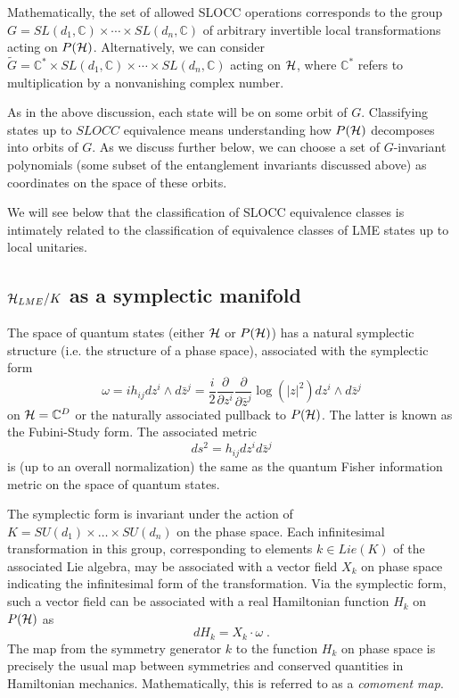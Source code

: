 \documentclass[12pt]{article}
\theoremstyle{definition}
\newcommand{\be}{\begin{equation}}
\newcommand{\ee}{\end{equation}}
\begin{document}
Mathematically, the set of allowed SLOCC operations corresponds to the group $G = SL(d_1, \mathbb{C}) \times \cdots \times SL(d_n, \mathbb{C})$ of arbitrary invertible local transformations acting on $P({\cal H})$. Alternatively, we can consider $\tilde{G} = \mathbb{C}^* \times SL(d_1, \mathbb{C}) \times \cdots \times SL(d_n, \mathbb{C})$ acting on ${\cal H}$, where $\mathbb{C}^*$ refers to multiplication by a nonvanishing complex number.

As in the above discussion, each state will be on some orbit of $G$. Classifying states up to $SLOCC$ equivalence means understanding how $P({\cal H})$ decomposes into orbits of $G$. As we discuss further below, we can choose a set of $G$-invariant polynomials (some subset of the entanglement invariants discussed above) as coordinates on the space of these orbits.

We will see below that the classification of SLOCC equivalence classes is intimately related to the classification of equivalence classes of LME states up to local unitaries.

\subsection{${\cal H}_{LME}/K$ as a symplectic manifold}

The space of quantum states (either ${\cal H}$ or $P({\cal H})$) has a natural symplectic structure (i.e. the structure of a phase space), associated with the symplectic form
\be
\omega = i h_{ij} dz^{i} \wedge  d\bar{z}^j =  \frac{i}{2} \frac{\partial}{\partial z^i} \frac{\partial}{\partial \bar{z}^j} \log (|z|^2) dz^{i} \wedge  d\bar{z}^j
\ee
on ${\cal H} = \mathbb{C}^D$ or the naturally associated pullback to $P({\cal H})$. The latter is known as the Fubini-Study form. The associated metric
\be
ds^2 = h_{ij} dz^i d \bar{z}^j
\ee
is (up to an overall normalization) the same as the quantum Fisher information metric on the space of quantum states.

The symplectic form is invariant under the action of $K = SU(d_1) \times \dots \times SU(d_n)$ on the phase space. Each infinitesimal transformation  in this group, corresponding to elements $k \in Lie(K)$ of the associated Lie algebra, may be associated with a vector field $X_k$ on phase space indicating the infinitesimal form of the transformation. Via the symplectic form, such a vector field can be associated with a real Hamiltonian function $H_k$ on $P({\cal H})$ as
\be
d H_k = {X_k} \cdot \omega \; .
\ee
The map from the symmetry generator $k$ to the function $H_k$ on phase space is precisely the usual map between symmetries and conserved quantities in Hamiltonian mechanics. Mathematically, this is referred to as a {\it comoment map}.
\end{document}
